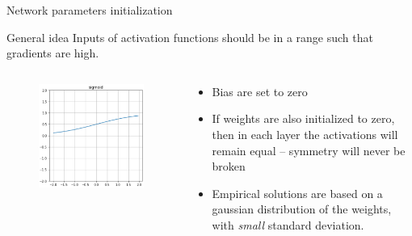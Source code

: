 \documentclass[xcolor=pdftex,dvipsnames,table,mathserif]{beamer}
\begin{document}
\begin{frame}{Network parameters initialization}

  \begin{block}{General idea}
    Inputs of activation functions should be in a range such that gradients are high.
  \end{block}

  \begin{columns}
    \begin{column}{.3\textwidth}
      \begin{figure}[ht]
        \centering
        \includegraphics[width=\textwidth]{act_sigm.png}
      \end{figure}

    \end{column}

    \begin{column}{.7\textwidth}
      \begin{itemize}
      \item Bias are set to zero
      \item If weights are also initialized to zero, then in each layer the activations will remain equal -- symmetry will never be broken
      \item Empirical solutions are based on a gaussian distribution of the weights, with \textit{small} standard deviation.
      \end{itemize}
    \end{column}
  \end{columns}
\end{frame}
\end{document}
